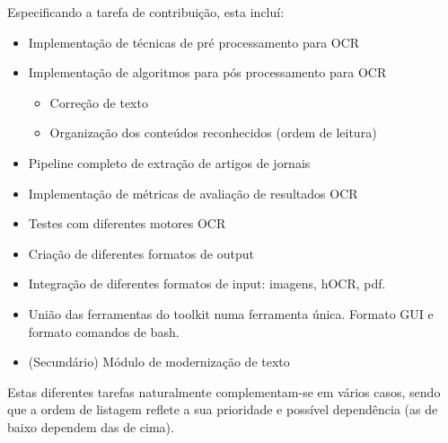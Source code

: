 Especificando a tarefa de contribuição, esta incluí:
\begin{itemize}\setlength\itemsep{0.1em}
    \item Implementação de técnicas de pré processamento para OCR
    \item Implementação de algoritmos para pós processamento para OCR
    \begin{itemize}
        \item Correção de texto
        \item Organização dos conteúdos reconhecidos (ordem de leitura)
    \end{itemize}
    \item Pipeline completo de extração de artigos de jornais
    \item Implementação de métricas de avaliação de resultados OCR
    \item Testes com diferentes motores OCR
    \item Criação de diferentes formatos de output
    \item Integração de diferentes formatos de input: imagens, hOCR, pdf.
    \item União das ferramentas do toolkit numa ferramenta única. Formato GUI e formato comandos de bash.
    \item (Secundário) Módulo de modernização de texto
\end{itemize}

Estas diferentes tarefas naturalmente complementam-se em vários casos, sendo que a ordem de listagem reflete a sua prioridade e possível dependência (as de baixo dependem das de cima).